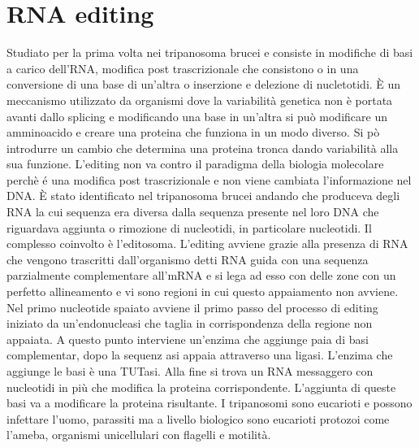 \section{RNA editing}
Studiato per la prima volta nei tripanosoma brucei e consiste in modifiche di basi a carico dell'RNA, modifica post trascrizionale che consistono o in una conversione di una base di
un'altra o inserzione e delezione di nucletotidi. \`E un meccanismo utilizzato da organismi dove la variabilit\`a genetica non \`e portata avanti dallo splicing e modificando una 
base in un'altra si pu\`o modificare un amminoacido e creare una proteina che funziona in un modo diverso. Si p\`o introdurre un cambio che determina una proteina tronca dando 
variabilit\`a alla sua funzione. L'editing non va contro il paradigma della biologia molecolare perch\`e \'e una modifica post trascrizionale e non viene cambiata l'informazione nel DNA. 
\`E stato identificato nel tripanosoma brucei andando che produceva degli RNA la cui sequenza era diversa dalla sequenza presente nel loro DNA che riguardava aggiunta o rimozione di 
nucleotidi, in particolare nucleotidi. Il complesso coinvolto \`e l'editosoma. L'editing avviene grazie alla presenza di RNA che vengono trascritti dall'organismo detti RNA guida con
una sequenza parzialmente complementare all'mRNA e si lega ad esso con delle zone con un perfetto allineamento e vi sono regioni in cui questo appaiamento non avviene. Nel primo 
nucleotide spaiato avviene il primo passo del processo di editing iniziato da un'endonucleasi che taglia in corrispondenza della regione non appaiata. A questo punto interviene un'enzima
che aggiunge paia di basi complementar, dopo la sequenz asi appaia attraverso una ligasi. L'enzima che aggiunge le basi \`e una TUTasi. Alla fine si trova un RNA messaggero con nucleotidi
in pi\`u che modifica la proteina corrispondente. L'aggiunta di queste basi va a modificare la proteina risultante. I tripanosomi sono eucarioti e possono infettare l'uomo, parassiti 
ma a livello biologico sono eucarioti protozoi come l'ameba, organismi unicellulari con flagelli e motilit\`a. 
